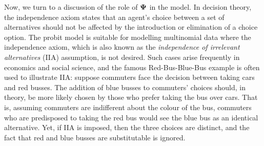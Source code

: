 %

Now, we turn to a discussion of the role of ${\bm\Psi}$ in the model.
In decision theory, the independence axiom states that an agent's choice between a set of alternatives should not be affected by the introduction or elimination of a choice option.
The probit model is suitable for modelling multinomial data where the independence axiom, which is also known as the \emph{independence of irrelevant alternatives} (IIA) assumption, is not desired. 
Such cases arise frequently in economics and social science, and the famous Red-Bus-Blue-Bus example is often used to illustrate IIA:
suppose commuters face the decision between taking cars and red busses. 
The addition of blue busses to commuters' choices should, in theory, be more likely chosen by those who prefer taking the bus over cars.
That is, assuming commuters are indifferent about the colour of the bus, commuters who are predisposed to taking the red bus would see the blue bus as an identical alternative.
 Yet, if IIA is imposed, then the three choices are distinct, and the fact that red and blue busses are substitutable is ignored.

